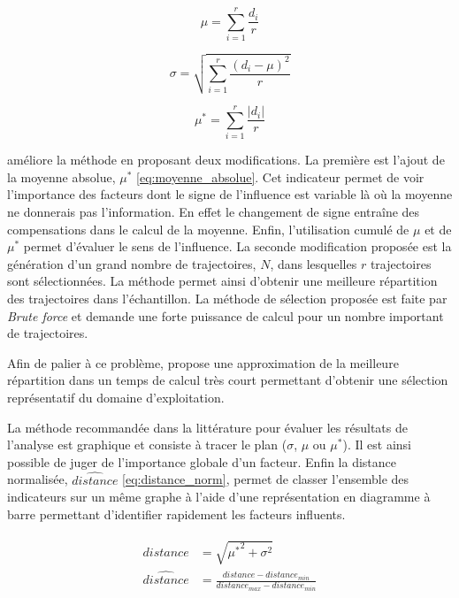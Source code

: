 \begin{equation}\label{eq:moyenne}
    \mu = \sum_{i = 1}^{r} \frac{d_{i}}{r}
\end{equation}

\begin{equation}\label{eq:ecart_type}
    \sigma = \sqrt{\sum_{i=1}^{r}\frac{(d_{i} - \mu)^{2}}{r}}
\end{equation}

\begin{equation}\label{eq:moyenne_absolue}
    \mu^{*} = \sum_{i = 1}^{r} \frac{\lvert d_{i} \rvert}{r}
\end{equation}

\cite{Campolongo20071509} améliore la méthode en proposant deux modifications. La première
est l’ajout de la moyenne absolue, $\mu^{*}$ \eqref{eq:moyenne_absolue}. Cet indicateur permet
de voir l’importance des facteurs dont le signe de l’influence est variable là où
la moyenne ne donnerais pas l’information. En effet le changement de signe
entraîne des compensations dans le calcul de la moyenne.
Enfin, l’utilisation cumulé de $\mu$ et de $\mu^{*}$ permet d’évaluer le sens de
l’influence.
La seconde modification proposée est la génération d’un grand nombre de trajectoires, $N$,
dans lesquelles $r$ trajectoires sont sélectionnées. La méthode permet ainsi
d’obtenir une meilleure répartition des trajectoires dans l’échantillon.
La méthode de sélection proposée est faite par \emph{Brute force} et demande une forte puissance
de calcul pour un nombre important de trajectoires.

Afin de palier à ce problème, \cite{Ruano2012103} propose une approximation de
la meilleure répartition dans un temps de calcul très court permettant d’obtenir
une sélection représentatif du domaine d’exploitation.

La méthode recommandée dans la littérature pour évaluer les résultats de l’analyse
est graphique et consiste à tracer le plan ($\sigma$, $\mu$ ou $\mu^{*}$). Il est
ainsi possible de juger de l’importance globale d’un facteur.
Enfin la distance normalisée, $\hat{distance}$ \eqref{eq:distance_norm}, permet
de classer l’ensemble des indicateurs sur un même graphe à l’aide d’une représentation
en diagramme à barre permettant d’identifier rapidement les facteurs influents.

\begin{align}\label{eq:distance_norm}
    \begin{split}
        distance        &= \sqrt{{\mu^{*}}^2 + \sigma^{2}} \\
        \hat{distance}  &=  \frac{distance - distance_{min}}{distance_{max} - distance_{min}}
    \end{split}
\end{align}

